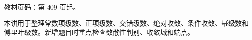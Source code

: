 
\begin{knowledgeBox}
教材页码：第 409 页起。

本讲用于整理常数项级数、正项级数、交错级数、绝对收敛、条件收敛、幂级数和傅里叶级数。新增题目时重点检查敛散性判别、收敛域和端点。
\end{knowledgeBox}
